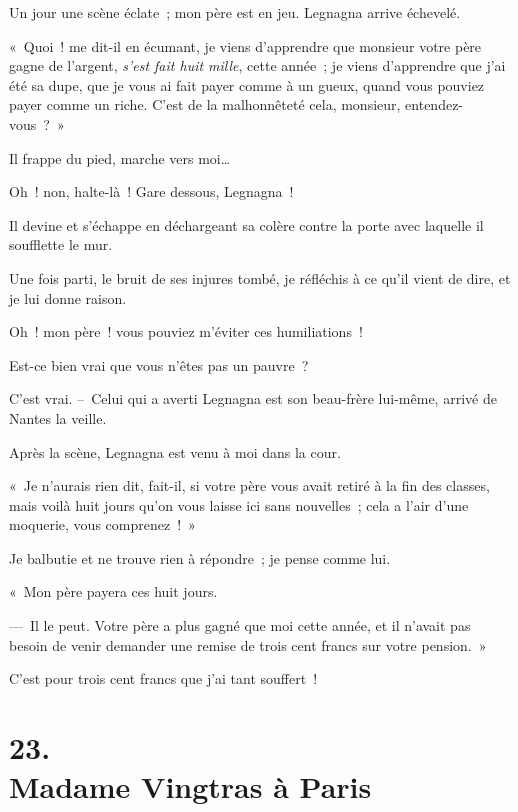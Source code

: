 \documentclass[french,twoside]{book} %
\begin{document}
\bigbreak
\noindent Un jour une scène éclate ; mon père est en jeu. Legnagna arrive échevelé.\par
« Quoi ! me dit-il en écumant, je viens d’apprendre que monsieur votre père gagne de l’argent, \emph{s’est fait huit mille}, cette année ; je viens d’apprendre que j’ai été sa dupe, que je vous ai fait payer comme à un gueux, quand vous pouviez payer comme un riche. C’est de la malhonnêteté cela, monsieur, entendez-vous ? »\par
Il frappe du pied, marche vers moi…\par
Oh ! non, halte-là ! Gare dessous, Legnagna !\par
Il devine et s’échappe en déchargeant sa colère contre la porte avec laquelle il soufflette le mur.\par
Une fois parti, le bruit de ses injures tombé, je réfléchis à ce qu’il vient de dire, et je lui donne raison.\par
Oh ! mon père ! vous pouviez m’éviter ces humiliations !\par
Est-ce bien vrai que vous n’êtes pas un pauvre ?\par
C’est vrai. – Celui qui a averti Legnagna est son beau-frère lui-même, arrivé de Nantes la veille.\par
Après la scène, Legnagna est venu à moi dans la cour.\par
« Je n’aurais rien dit, fait-il, si votre père vous avait retiré à la fin des classes, mais voilà huit jours qu’on vous laisse ici sans nouvelles ; cela a l’air d’une moquerie, vous comprenez ! »\par
Je balbutie et ne trouve rien à répondre ; je pense comme lui.\par
« Mon père payera ces huit jours.\par
— Il le peut. Votre père a plus gagné que moi cette année, et il n’avait pas besoin de venir demander une remise de trois cent francs sur votre pension. »\par
C’est pour trois cent francs que j’ai tant souffert !
\section[{23. Madame Vingtras à Paris}]{23. \\
Madame Vingtras à Paris}\renewcommand{\leftmark}{23. \\
Madame Vingtras à Paris}
\end{document}

